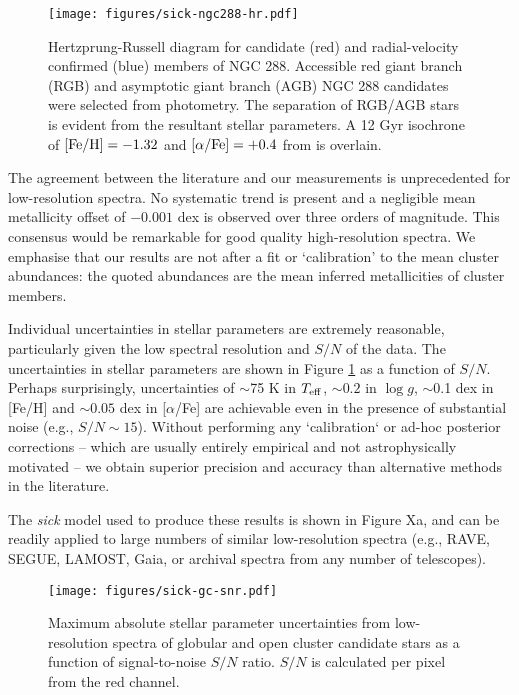 \documentclass{aastex}
\newcommand{\sick}{\textit{sick}}
\begin{document}
\begin{figure}
\texttt{[image: figures/sick-ngc288-hr.pdf]}
\caption{Hertzprung-Russell diagram for candidate (red) and radial-velocity confirmed (blue) members of NGC 288. Accessible red giant branch (RGB) and asymptotic giant branch (AGB) NGC 288 candidates were selected from \citet{who} photometry. The separation of RGB/AGB stars is evident from the resultant stellar parameters. A 12 Gyr isochrone of ${{\rm [Fe/H]} = -1.32}$ \citep{harris} and ${[\alpha/{\rm Fe}] = +0.4}$ from \citet{dotter} is overlain.}
\end{figure}


The agreement between the literature and our measurements is unprecedented for low-resolution spectra. No systematic trend is present and a negligible mean metallicity offset of $-0.001$ dex is observed over three orders of magnitude. This consensus would be remarkable for good quality high-resolution spectra. We emphasise that our results are not after a fit or `calibration' to the mean cluster abundances: the quoted abundances are the mean inferred metallicities of cluster members.

Individual uncertainties in stellar parameters are extremely reasonable, particularly given the low spectral resolution and $S/N$ of the data. The uncertainties in stellar parameters are shown in Figure \ref{fig:gc-snr} as a function of $S/N$. Perhaps surprisingly, uncertainties of $\sim$75 K in $T_{\rm eff}$, $\sim0.2$ in $\log{g}$, $\sim$0.1 dex in [Fe/H] and $\sim0.05$ dex in [$\alpha$/Fe] are achievable even in the presence of substantial noise (e.g., $S/N \sim 15$). Without performing any `calibration` or ad-hoc posterior corrections -- which are usually entirely empirical and not astrophysically motivated -- we obtain superior precision and accuracy than alternative methods in the literature.

The \sick{} model used to produce these results is shown in Figure Xa, and can be readily applied to large numbers of similar low-resolution spectra (e.g., RAVE, SEGUE, LAMOST, Gaia, or archival spectra from any number of telescopes).

\begin{figure}
\label{fig:gc-snr}
\texttt{[image: figures/sick-gc-snr.pdf]}
\caption{Maximum absolute stellar parameter uncertainties from low-resolution spectra of globular and open cluster candidate stars as a function of signal-to-noise $S/N$ ratio. $S/N$ is calculated per pixel from the red channel.}
\end{figure}
\end{document}
